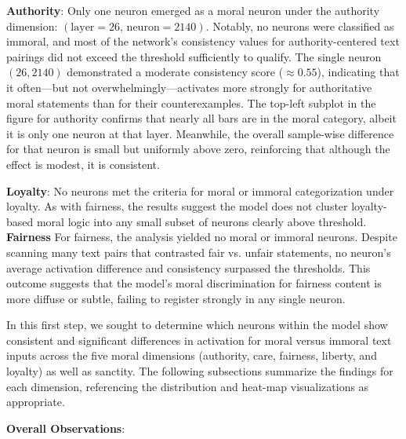 \textbf{Authority}: Only one neuron emerged as a moral neuron under the authority dimension: \((\mathrm{layer}=26,\, \mathrm{neuron}=2140)\). Notably, no neurons were classified as immoral, and most of the network’s consistency values for authority-centered text pairings did not exceed the threshold sufficiently to qualify. The single neuron \((26,2140)\) demonstrated a moderate consistency score (\(\approx 0.55\)), indicating that it often—but not overwhelmingly—activates more strongly for authoritative moral statements than for their counterexamples. The top-left subplot in the figure for authority confirms that nearly all bars are in the moral category, albeit it is only one neuron at that layer. Meanwhile, the overall sample-wise difference for that neuron is small but uniformly above zero, reinforcing that although the effect is modest, it is consistent.


\textbf{Loyalty}: No neurons met the criteria for moral or immoral categorization under loyalty. As with fairness, the results suggest the model does not cluster loyalty-based moral logic into any small subset of neurons clearly above threshold. 
\textbf{Fairness} For fairness, the analysis yielded no moral or immoral neurons. Despite scanning many text pairs that contrasted fair vs. unfair statements, no neuron’s average activation difference and consistency surpassed the thresholds. This outcome suggests that the model’s moral discrimination for fairness content is more diffuse or subtle, failing to register strongly in any single neuron. 

In this first step, we sought to determine which neurons within the model show consistent and significant differences in activation for moral versus immoral text inputs across the five moral dimensions (authority, care, fairness, liberty, and loyalty) as well as sanctity. The following subsections summarize the findings for each dimension, referencing the distribution and heat-map visualizations as appropriate.

\textbf{Overall Observations}:

